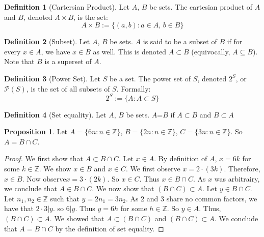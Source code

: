 \documentclass{article}
\theoremstyle{definition}
\newtheorem{define}{Definition}[subsection]
\newtheorem{prop}{Proposition}[subsection]
\begin{document}
\begin{define}[Cartersian Product]
Let $A$, $B$ be sets. The cartesian product of $A$ and $B$, denoted $A\times B$, is the set: $$A\times B:=\{(a,b):a\in A\text{, }b\in B\}$$
\end{define}

\begin{define}[Subset]
Let $A$, $B$ be sets. $A$ is said to be a subset of $B$ if for every $x\in A$, we have $x\in B$ as well. This is denoted $A\subset B$ (equivocally, $A\subseteq B$). Note that $B$ is a superset of $A$.
\end{define}

\begin{define}[Power Set]
Let $S$ be a set. The power set of $S$, denoted $2^{S}$, or $\mathcal{P}(S)$, is the set of all subsets of $S$. Formally: $$2^{S}:=\{A:A\subset S\}$$
\end{define}

\begin{define}[Set equality]
Let $A$, $B$ be sets. $A$=$B$ if $A\subset B$ and $B \subset A$
\end{define}

\begin{prop}
Let $A = \{6n: n\in \mathbb{Z}\}$, $B=\{2n: n\in \mathbb{Z}\}$, $C=\{3n: n\in \mathbb{Z}\}$. So $A= B\cap C$.
\end{prop}
\begin{proof}
We first show that $A \subset B\cap C$. Let $x \in A$. By definition of $A$, $x =6k$ for some $k \in \mathbb{Z}$. We show $x \in B$ and $x \in C$. We first observe $x = 2\cdot(3k)$. Therefore, $x \in B$. Now observe$ x = 3\cdot(2k)$. So $x \in C$. Thus $x \in B\cap C$. As $x$ was arbitrairy, we conclude that $A \in B\cap C$. We now show that $(B\cap C)\subset A$. Let $y \in B\cap C$. Let $n_1, n_2 \in \mathbb{Z}$ such that $y=2n_1 = 3n_2$. As 2 and 3 share no common factors, we have that $2\cdot 3|y$. so $6|y$. Thus $y = 6h$ for some $h \in \mathbb{Z}$. So $y \in A$. Thus, $(B\cap C) \subset A$. We showed that $A \subset (B\cap C)$ and $(B\cap C)\subset A$. We conclude that $A= B\cap C$ by the definition of set equality.
\end{proof}
\end{document}
